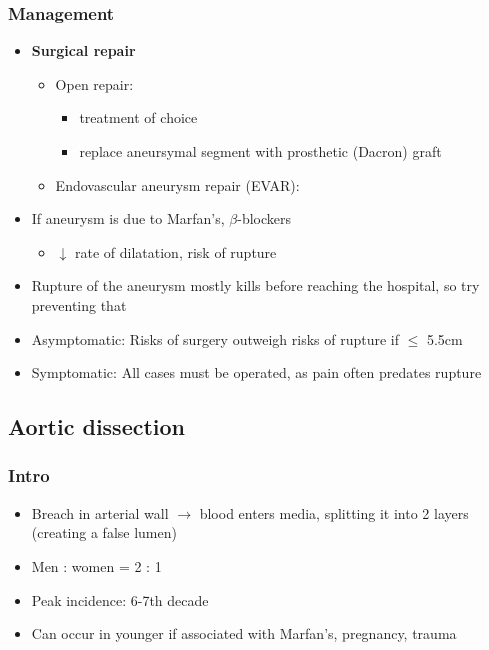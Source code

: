 \documentclass[
  12pt,
]{memoir}
\providecommand{\tightlist}{%
  \setlength{\itemsep}{0pt}\setlength{\parskip}{0pt}}
\begin{document}
\hypertarget{management-6}{%
\subsubsection{Management}\label{management-6}}

\begin{itemize}
\tightlist
\item
  \textbf{Surgical repair}

  \begin{itemize}
  \tightlist
  \item
    Open repair:

    \begin{itemize}
    \tightlist
    \item
      treatment of choice
    \item
      replace aneursymal segment with prosthetic (Dacron) graft
    \end{itemize}
  \item
    Endovascular aneurysm repair (EVAR):
  \end{itemize}
\item
  If aneurysm is due to Marfan's, \(\beta\)-blockers

  \begin{itemize}
  \tightlist
  \item
    \(\downarrow\) rate of dilatation, risk of rupture
  \end{itemize}
\item
  Rupture of the aneurysm mostly kills before reaching the hospital, so
  try preventing that
\item
  Asymptomatic: Risks of surgery outweigh risks of rupture if \(\le\)
  5.5cm
\item
  Symptomatic: All cases must be operated, as pain often predates
  rupture
\end{itemize}

\hypertarget{aortic-dissection}{%
\subsection{Aortic dissection}\label{aortic-dissection}}

\hypertarget{intro-5}{%
\subsubsection{Intro}\label{intro-5}}

\begin{itemize}
\tightlist
\item
  Breach in arterial wall \(\rightarrow\) blood enters media, splitting
  it into 2 layers (creating a false lumen)
\item
  Men : women = 2 : 1
\item
  Peak incidence: 6-7th decade
\item
  Can occur in younger if associated with Marfan's, pregnancy, trauma
\end{itemize}
\end{document}
